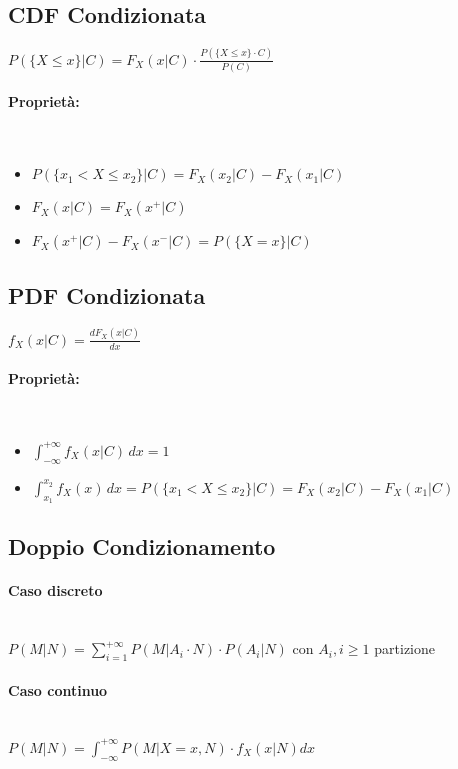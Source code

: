 \documentclass{article}
\begin{document}
\subsection{CDF Condizionata}
$P\left( \big\{ X \leq x\big\}|C \right) = F_X(x|C) \cdot \frac{P\left( \big\{ X \leq x\big\} \cdot C \right)}{P(C)}$

\paragraph{Proprietà:} ~\\
\begin{itemize}
    \item $P\left( \big\{x_1 < X \leq x_2\big\} \big| C \right) = F_X(x_2 | C) - F_X(x_1 | C)$
    \item $F_X(x|C) = F_X(x^+ | C)$
    \item $F_X(x^+ | C) - F_X(x^- | C) = P\left( \big\{X = x\big\} \big| C \right)$
\end{itemize}

\subsection{PDF Condizionata}
$f_X(x|C) = \frac{dF_X(x|C)}{dx}$
\paragraph{Proprietà:} ~\\
\begin{itemize}
    \item $\int_{-\infty}^{+\infty} f_X(x|C) \,dx = 1$
    \item $\int_{x_1}^{x_2} f_X(x) \,dx = P\left( \big\{x_1 < X \leq x_2\big\} \big| C \right) = F_X(x_2 | C) - F_X(x_1 | C)$
\end{itemize}

\subsection{Doppio Condizionamento}
\paragraph{Caso discreto} ~\\
$P(M|N) = \sum_{i=1}^{+\infty} P(M|A_i \cdot N) \cdot P(A_i|N)$ con $A_i, i \geq 1$ partizione 
\paragraph{Caso continuo} ~\\
$P(M|N) = \int_{-\infty}^{+\infty} P(M|X = x , N) \cdot f_X(x|N) dx$
\end{document}

